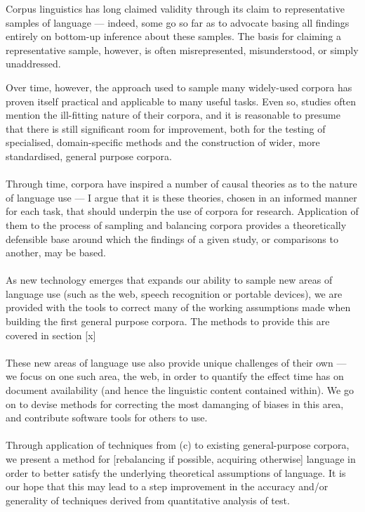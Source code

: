 
Corpus linguistics has long claimed validity through its claim to representative samples of language --- indeed, some go so far as to advocate basing all findings entirely on bottom-up inference about these samples.  The basis for claiming a representative sample, however, is often misrepresented, misunderstood, or simply unaddressed.

Over time, however, the approach used to sample many widely-used corpora has proven itself practical and applicable to many useful tasks.  Even so, studies often mention the ill-fitting nature of their corpora, and it is reasonable to presume that there is still significant room for improvement, both for the testing of specialised, domain-specific methods and the construction of wider, more standardised, general purpose corpora.

\paragraph{}
Through time, corpora have inspired a number of causal theories as to the nature of language use --- I argue that it is these theories, chosen in an informed manner for each task, that should underpin the use of corpora for research.  Application of them to the process of sampling and balancing corpora provides a theoretically defensible base around which the findings of a given study, or comparisons to another, may be based.

\paragraph{}
As new technology emerges that expands our ability to sample new areas of language use (such as the web, speech recognition or portable devices), we are provided with the tools to correct many of the working assumptions made when building the first general purpose corpora.  The methods to provide this are covered in section [x]

\paragraph{}
These new areas of language use also provide unique challenges of their own --- we focus on one such area, the web, in order to quantify the effect time has on document availability (and hence the linguistic content contained within).  We go on to devise methods for correcting the most damanging of biases in this area, and contribute software tools for others to use.

\paragraph{}
Through application of techniques from (c) to existing general-purpose corpora, we present a method for [rebalancing if possible, acquiring otherwise] language in order to better satisfy the underlying theoretical assumptions of language.  It is our hope that this may lead to a step improvement in the accuracy and/or generality of techniques derived from quantitative analysis of test.



